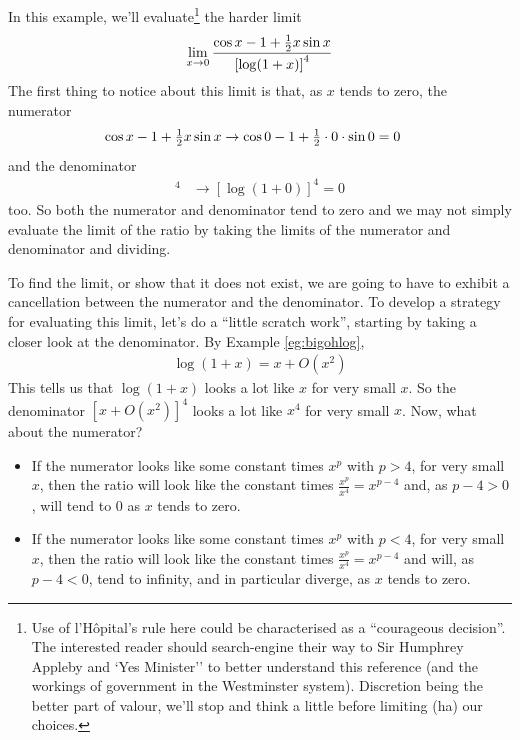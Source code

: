 \begin{eg}\label{bigohlimitB}
In this example, we'll evaluate\footnote{Use of l'H\^opital's rule here could be characterised as a ``courageous
decision''. The interested reader should search-engine their way to Sir Humphrey Appleby and `Yes Minister'' to better
understand this reference (and the workings of government in the Westminster system). Discretion being the better
part of valour, we'll stop and think a little before limiting (ha) our choices.} the harder limit
\begin{equation*}
\lim_{x\rightarrow 0}\frac{\cos x -1 + \tfrac{1}{2} x\sin x}{{[\log(1+x)]}^4}
\end{equation*}
The first thing to notice about this limit is that, as $x$ tends to zero,
the numerator
\begin{align*}
\cos x -1 + \tfrac{1}{2} x\sin x &\to \cos 0 -1 +\tfrac{1}{2}\cdot 0\cdot\sin 0=0
\end{align*}
and the denominator
\begin{align*}
  [\log(1+x)]^4 & \to [\log(1+0)]^4=0
\end{align*}
too. So both the numerator and denominator tend to zero and we may not simply evaluate  the limit of the ratio by taking
the limits of the numerator and denominator and dividing.

To find the limit, or show that it does not exist, we are going to have to exhibit a cancellation between the numerator
and the denominator. To develop a strategy for evaluating this limit, let's do a ``little scratch work'', starting by
taking a closer look at the denominator. By Example \ref{eg:bigohlog},
\begin{align*}
\log(1+x) = x+O(x^2)
\end{align*}
This tells us that $\log(1+x)$ looks a lot like $x$ for very small $x$.
So the denominator $[x+O(x^2)]^4$ looks a lot like $x^4$ for very small $x$.
Now, what about the numerator?
\begin{itemize} \itemsep1pt \parskip0pt  \itemindent-15pt
\item If the numerator looks like some constant times $x^p$ with $p>4$,
for very small $x$, then the ratio will look like the constant times
$\frac{x^p}{x^4}=x^{p-4}$ and, as $p-4>0$, will tend to $0$ as $x$
tends to zero.

\item If the numerator looks like some constant times $x^p$ with $p<4$,
for very small $x$, then the ratio will look like the constant times
$\frac{x^p}{x^4}=x^{p-4}$ and will, as $p-4<0$, tend to infinity,
and in particular diverge, as $x$ tends to zero.


\end{itemize}
\end{eg}
